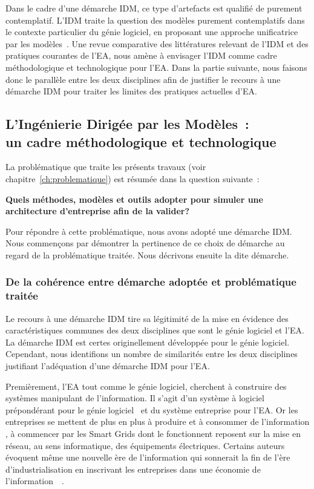 Dans le cadre d'une démarche IDM, ce type d'artefacts est qualifié
de purement contemplatif. L'IDM traite la question des modèles purement
contemplatifs dans le contexte particulier du génie logiciel, en proposant
une approche unificatrice par les modèles~\cite{jezequel2006genie}.
Une revue comparative des littératures relevant de l'IDM et des pratiques courantes
de l'EA, nous amène à envisager l'IDM comme cadre méthodologique
et technologique pour l'EA. Dans la partie suivante,
nous faisons donc le parallèle entre les deux disciplines afin de
justifier le recours à une démarche IDM  pour traiter les limites  des
pratiques actuelles d'EA.



    \subsection{L'Ingénierie Dirigée par les Modèles~:\\ un cadre méthodologique et technologique}

    La problématique que traite les présents travaux (voir chapitre~\ref{ch:problematique})
    est résumée dans la question suivante~:

    {\bfseries Quels méthodes, modèles et outils adopter pour simuler une architecture d'entreprise afin de la valider?}

    Pour répondre à cette problématique, nous avons adopté une démarche IDM.
    Nous commençons par démontrer la pertinence de ce choix de démarche
    au regard de la problématique traitée.  Nous décrivons ensuite la dite démarche.

            \subsubsection{De la cohérence entre démarche adoptée et
    problématique traitée}

    Le recours à une démarche IDM tire sa légitimité de la mise en
    évidence des caractéristiques communes des deux disciplines que
    sont le génie logiciel et l'EA. La démarche IDM est certes originellement développée
    pour le génie logiciel. Cependant, nous identifions un nombre de similarités
    entre les deux disciplines justifiant l'adéquation d'une démarche IDM pour l'EA.

    Premièrement, l'EA tout comme le génie logiciel, cherchent à construire
    des systèmes manipulant de l'information. Il s'agit d'un système à
    logiciel prépondérant pour le génie
    logiciel~\cite{jezequel2012ingenierie} et du système entreprise pour l'EA.
    Or les entreprises se mettent de plus en plus à produire et à
    consommer de l'information \cite{zachman1997enterprise}, à
    commencer par les Smart Grids dont le fonctionnent reposent sur la
    mise en réseau, au sens informatique, des équipements électriques. Certains auteurs
    évoquent même une nouvelle ère de l'information qui sonnerait
    la fin de l'ère d'industrialisation en inscrivant les entreprises dans une économie
    de l'information~\cite{toffler1981third}~\cite{webster2014theories}.

